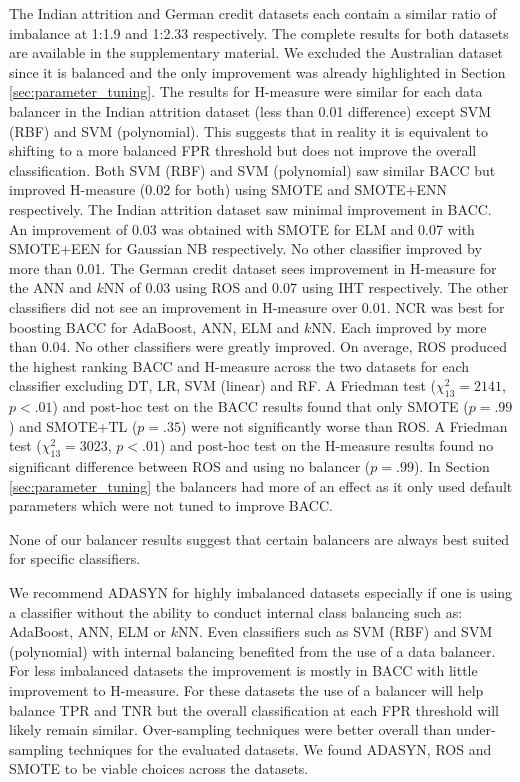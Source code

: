 \documentclass{sig-alternate-05-2015}
\begin{document}
	The Indian attrition and German credit datasets each contain a similar ratio of imbalance at 1:1.9 and 1:2.33 respectively. The complete results for both datasets are available in the supplementary material. We excluded the Australian dataset since it is balanced and the only improvement was already highlighted in Section \ref{sec:parameter_tuning}. The results for H-measure were similar for each data balancer in the Indian attrition dataset (less than 0.01 difference) except SVM (RBF) and SVM (polynomial). This suggests that in reality it is equivalent to shifting to a more balanced FPR threshold but does not improve the overall classification. Both SVM (RBF) and SVM (polynomial) saw similar BACC but improved H-measure (0.02 for both) using SMOTE and SMOTE+ENN respectively. The Indian attrition dataset saw minimal improvement in BACC. An improvement of 0.03 was obtained with SMOTE for ELM and 0.07 with SMOTE+EEN for Gaussian NB respectively. No other classifier improved by more than 0.01. The German credit dataset sees improvement in H-measure for the ANN and $k$NN of 0.03 using ROS and 0.07 using IHT respectively. The other classifiers did not see an improvement in H-measure over 0.01. NCR was best for boosting BACC for AdaBoost, ANN, ELM and $k$NN. Each improved by more than 0.04. No other classifiers were greatly improved. On average, ROS produced the highest ranking BACC and H-measure across the two datasets for each classifier excluding DT, LR, SVM (linear) and RF. A Friedman test ($\chi^2_{13}=2141$, $p<.01$) and post-hoc test on the BACC results found that only SMOTE ($p=.99$) and SMOTE+TL ($p=.35$) were not significantly worse than ROS. A Friedman test ($\chi^2_{13}=3023$, $p<.01$) and post-hoc test on the H-measure results found no significant difference between ROS and using no balancer ($p=.99$). In Section \ref{sec:parameter_tuning} the balancers had more of an effect as it only used default parameters which were not tuned to improve BACC. 
	
	None of our balancer results suggest that certain balancers are always best suited for specific classifiers. 
		
	We recommend ADASYN for highly imbalanced datasets especially if one is using a classifier without the ability to conduct internal class balancing such as: AdaBoost, ANN, ELM or $k$NN. Even classifiers such as SVM (RBF) and SVM (polynomial) with internal balancing benefited from the use of a data balancer. For less imbalanced datasets the improvement is mostly in BACC with little improvement to H-measure. For these datasets the use of a balancer will help balance TPR and TNR but the overall classification at each FPR threshold will likely remain similar. Over-sampling techniques were better overall than under-sampling techniques for the evaluated datasets. We found ADASYN, ROS and SMOTE to be viable choices across the datasets.
	
\end{document}
